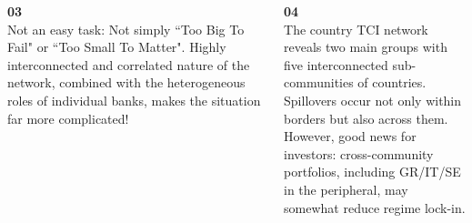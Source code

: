 \documentclass[aspectratio=169,10pt]{beamer}
\begin{document}
{\begin{frame}[plain]
\begin{columns}[T,onlytextwidth]
  \begin{tcolorbox}[enhanced,colback=DarkBlue,colframe=DarkBlue,
    coltext=white,boxrule=0pt,arc=3pt,
    left=5pt,right=5pt,top=3pt,bottom=3pt]
    {\color{Gold}\Large\bfseries 03}\\[2pt]
    {\scriptsize Not an easy task: Not simply ``Too Big To Fail" or ``Too Small To Matter". Highly interconnected and correlated nature of the network, combined with the heterogeneous roles of individual banks, makes the situation far more complicated!}
  \end{tcolorbox}
  \begin{tcolorbox}[enhanced,colback=DarkBlue,colframe=DarkBlue,
    coltext=white,boxrule=0pt,arc=3pt,
    left=5pt,right=5pt,top=3pt,bottom=3pt]
    {\color{Gold}\Large\bfseries 04}\\[2pt]
    {\scriptsize The country TCI network reveals two main groups with five interconnected sub-communities of countries. Spillovers occur not only within borders but also across them.\\
    However, good news for investors: cross-community portfolios, including GR/IT/SE in the peripheral, may somewhat reduce regime lock-in.}
  \end{tcolorbox}
\end{columns}
\end{frame}
}
\end{document}
